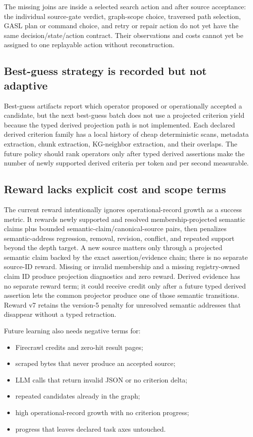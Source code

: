 \documentclass[11pt]{article}
\begin{document}
The missing joins are inside a selected search action and after source
acceptance: the individual source-gate verdict, graph-scope choice, traversed
path selection, GASL plan or command choice, and retry or repair action do not
yet have the same decision/state/action contract.  Their observations and
costs cannot yet be assigned to one replayable action without reconstruction.

\subsection{Best-guess strategy is recorded but not adaptive}

Best-guess artifacts report which operator proposed or operationally accepted a
candidate, but the next best-guess batch does not use a projected criterion
yield because the typed derived projection path is not implemented.  Each
declared derived criterion family has a local history of cheap deterministic
scans, metadata extraction, chunk extraction, KG-neighbor extraction, and their overlaps.  The
future policy should rank operators only after typed derived assertions make
the number of newly supported derived criteria per token and per second
measurable.

\subsection{Reward lacks explicit cost and scope terms}

The current reward intentionally ignores operational-record growth as a
success metric.  It rewards newly supported and resolved membership-projected
semantic claims plus bounded semantic-claim/canonical-source pairs, then
penalizes semantic-address regression, removal, revision, conflict, and repeated
support beyond the depth target.  A new source matters only through a projected
semantic claim backed by the exact assertion/evidence chain; there is no
separate source-ID reward.  Missing or invalid membership and a missing
registry-owned claim ID produce projection diagnostics and zero reward.
Derived evidence has no separate reward term; it
could receive credit only after a future typed derived assertion lets the common
projector produce one of those semantic transitions.  Reward v7 retains the
version-5 penalty for unresolved semantic addresses that disappear without a
typed retraction.

Future learning also needs negative terms for:

\begin{itemize}
  \item Firecrawl credits and zero-hit result pages;
  \item scraped bytes that never produce an accepted source;
  \item LLM calls that return invalid JSON or no criterion delta;
  \item repeated candidates already in the graph;
  \item high operational-record growth with no criterion progress;
  \item progress that leaves declared task axes untouched.
\end{itemize}
\end{document}
